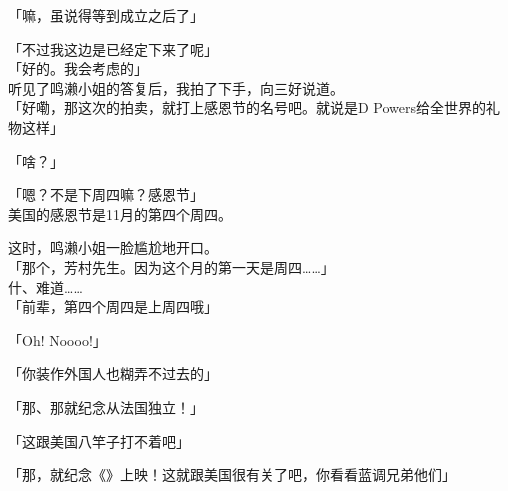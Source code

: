 「嘛，虽说得等到成立之后了」

「不过我这边是已经定下来了呢」\\

「好的。我会考虑的」\\

听见了鸣濑小姐的答复后，我拍了下手，向三好说道。\\

「好嘞，那这次的拍卖，就打上感恩节的名号吧。就说是D Powers给全世界的礼物这样」

「啥？」

「嗯？不是下周四嘛？感恩节」\\

美国的感恩节是11月的第四个周四。

这时，鸣濑小姐一脸尴尬地开口。\\

「那个，芳村先生。因为这个月的第一天是周四……」\\

什、难道……\\

「前辈，第四个周四是上周四哦」

「Oh! Noooo!」

「你装作外国人也糊弄不过去的」

「那、那就纪念从法国独立！」

「这跟美国八竿子打不着吧」

「那，就纪念《》上映！这就跟美国很有关了吧，你看看蓝调兄弟他们」

